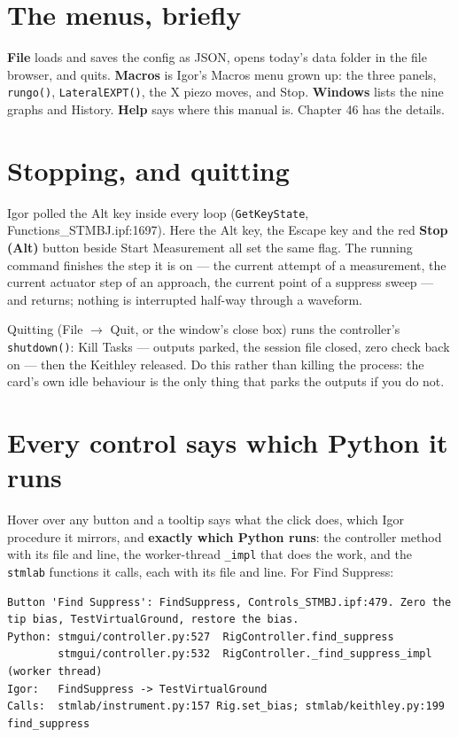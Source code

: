 \section{The menus, briefly}

\textbf{File} loads and saves the config as JSON, opens today's data folder in the file browser, and quits. \textbf{Macros} is Igor's Macros menu grown up: the three panels, \texttt{rungo()}, \texttt{Lateral\discretionary{}{}{}EXPT()}, the X piezo moves, and Stop. \textbf{Windows} lists the nine graphs and History. \textbf{Help} says where this manual is. Chapter 46 has the details.

\section{Stopping, and quitting}

Igor polled the Alt key inside every loop (\texttt{Get\discretionary{}{}{}Key\discretionary{}{}{}State}, Functions\_STMBJ.ipf:1697). Here the Alt key, the Escape key and the red \textbf{Stop (Alt)} button beside Start Measurement all set the same flag. The running command finishes the step it is on --- the current attempt of a measurement, the current actuator step of an approach, the current point of a suppress sweep --- and returns; nothing is interrupted half-way through a waveform.

Quitting (File $\rightarrow$ Quit, or the window's close box) runs the controller's \texttt{shutdown()}: Kill Tasks --- outputs parked, the session file closed, zero check back on --- then the Keithley released. Do this rather than killing the process: the card's own idle behaviour is the only thing that parks the outputs if you do not.

\section{Every control says which Python it runs}

Hover over any button and a tooltip says what the click does, which Igor procedure it mirrors, and \textbf{exactly which Python runs}: the controller method with its file and line, the worker-thread \texttt{\_\discretionary{}{}{}impl} that does the work, and the \texttt{stmlab} functions it calls, each with its file and line. For Find Suppress:

\begin{lstlisting}[style=out]
Button 'Find Suppress': FindSuppress, Controls_STMBJ.ipf:479. Zero the
tip bias, TestVirtualGround, restore the bias.
Python: stmgui/controller.py:527  RigController.find_suppress
        stmgui/controller.py:532  RigController._find_suppress_impl  (worker thread)
Igor:   FindSuppress -> TestVirtualGround
Calls:  stmlab/instrument.py:157 Rig.set_bias; stmlab/keithley.py:199 find_suppress
\end{lstlisting}


